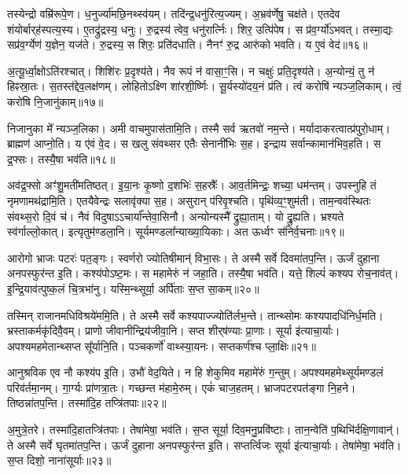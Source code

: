 तस्येन्द्रो वम्रि॑रूपे॒ण। ध॒नुर्ज्या॑मछि॒नथ्स्व॑यम्। 
तदि॑न्द्र॒धनु॑\-रित्य॒ज्यम्। अ॒भ्रव॑र्णेषु॒ चक्ष॑ते। 
एतदेव शंयोर्बार्‌ह॑स्पत्य॒स्य। ए॒तद्रु॑द्रस्य॒ धनुः। 
रु॒द्रस्य॑ त्वेव॒ धनु॑रार्त्निः। शिर॒ उत्पि॑पेष। 
स प्र॑व॒र्ग्यो॑\-ऽभवत्। तस्मा॒द्यः सप्र॑व॒र्ग्येण॑ य॒ज्ञेन॒ यज॑ते। 
रु॒द्रस्य॒ स शिरः॒ प्रति॑दधाति। नैनꣳ॑ रु॒द्र आरु॑को भवति। य ए॒वं वेद॑॥१६॥\ip\anuvakamend


अ॒त्यू॒र्ध्वा॒क्षो\-ऽति॑रश्चात्। शिशि॑रः प्र॒दृश्य॑ते। 
नैव रूपं न॑ वासा॒ꣳ॒सि। न चक्षुः॑ प्रति॒दृश्य॑ते। 
अ॒न्योन्यं॒ तु न॑ हिꣴस्रा॒तः। स॒तस्त॑द्देव॒लक्ष॑णम्। 
लोहितो\-ऽक्ष्णि शा॑रशी॒र्ष्णिः। सू॒र्यस्यो॑दय॒नं प्र॑ति। 
त्वं करोषि॑ न्यञ्ज॒लिकाम्। त्वं॒ करो॑षि नि॒जानु॑काम्॥१७॥\ip

निजानुका मे᳚ न्यञ्ज॒लिका। अमी वाचमुपास॑तामि॒ति। 
तस्मै सर्व ऋतवो॑ नम॒न्ते। मर्यादाकरत्वात्प्र॑\-पुरो॒धाम्। 
ब्राह्मण॑ आप्नो॒ति। य ए॑वं वे॒द। स खलु संवथ्सर एतैः सेनानी॑भिः स॒ह। 
इन्द्राय सर्वान्कामान॑भिव॒हति। स द्र॒फ्सः। तस्यै॒षा भव॑ति॥१८॥\ip

अव॑द्र॒फ्सो अꣳ॑शु॒मती॑मतिष्ठत्। इ॒या॒नः कृ॒ष्णो द॒शभिः॑ स॒हस्रैः᳚। 
आव॒र्तमिन्द्रः॒ शच्या॒ धम॑न्तम्। उपस्नुहि तं नृमणामथ॑द्रामि॒ति। 
एतयैवेन्द्रः सलावृ॑क्या स॒ह। असुरान्‌ प॑रिवृ॒श्चति। 
पृथि॑व्य॒ꣳ॒शुम॑ती। ताम॒न्वव॑स्थितः संवथ्स॒रो दि॒वं च॑। 
नैवं विदुषा\-ऽऽचार्या᳚न्तेवा॒सिनौ। अन्योन्यस्मै᳚ द्रुह्या॒ताम्। यो द्रु॒ह्यति। 
भ्रश्यते स्व॑र्गाल्लो॒कात्। इत्यृतुम॑ण्डला॒नि। 
सूर्यमण्डला᳚न्या\-ख्या॒यिकाः। अत ऊर्ध्वꣳ स॑निर्व॒चनाः॥१९॥\ip\anuvakamend


आरोगो भ्राजः पटरः॑ पत॒ङ्गः। स्वर्णरो ज्योतिषीमान्॑ विभा॒सः। 
ते अस्मै सर्वे दिवमा॑तप॒न्ति। ऊर्जं दुहाना अनपस्फुर॑न्त इ॒ति। 
कश्य॑पो\-ऽष्ट॒मः। स महामेरुं न॑ जहा॒ति। 
तस्यै॒षा भव॑ति। यत्ते॒ शिल्पं॑ कश्यप रोच॒नाव॑त्। 
इ॒न्द्रि॒याव॑त्पुष्क॒लं चि॒त्रभा॑नु। यस्मि॒न्थ्सूर्या॒ अर्पि॑ताः स॒प्त सा॒कम्॥२०॥\ip

तस्मिन्‌ राजानमधिविश्रये॑ममि॒ति। ते अस्मै सर्वे कश्यपाज्ज्यो\-ति॑र्लभ॒न्ते। 
तान्थ्सोमः कश्यपा\-दधि॑\-निर्ध॒मति। भ्रस्ताकर्मकृ॑दिवै॒वम्। 
प्राणो जीवानीन्द्रिय॑जीवा॒नि। सप्त शीर्‌ष॑ण्याः प्रा॒णाः। 
सूर्या इ॑त्याचा॒र्याः। अपश्यमहमेतान्थ्सप्त सू᳚र्यानि॒ति। 
पञ्च\-कर्णो॑ वाथ्स्या॒यनः। सप्तकर्ण॑श्च प्ला॒क्षिः॥२१॥\ip

आनुश्रविक एव नौ कश्य॑प इ॒ति। उभौ॑ वेद॒यिते। 
न हि शेकुमिव महामे॑रुं ग॒न्तुम्। अपश्यमहमेथ्सूर्यमण्डलं परिव॑र्तमा॒नम्। 
गा॒र्ग्यः प्रा॑णत्रा॒तः। गच्छन्त म॑हामे॒रुम्। एकं॑ चाज॒हतम्। 
भ्राजपटरपत॑ङ्गा नि॒हने। तिष्ठन्ना॑तप॒न्ति। तस्मा॑दि॒ह तप्त्रि॑तपाः॥२२॥\ip

अ॒मुत्रे॒तरे। तस्मा॑दि॒हातप्त्रि॑तपाः। तेषा॑मेषा॒ भव॑ति। 
स॒प्त सूर्या॒ दिव॒मनु॒प्रवि॑ष्टाः। तान॒न्वेति॑ प॒थिभि॑र्दक्षि॒णावान्॑। 
ते अस्मै सर्वे घृतमा॑तप॒न्ति। ऊर्जं दुहाना अनपस्फुर॑न्त इ॒ति। 
सप्तर्त्विजः सूर्या इ॑त्याचा॒र्याः। तेषा॑मेषा॒ भव॑ति। स॒प्त दिशो॒ नाना॑सूर्याः॥२३॥\ip

